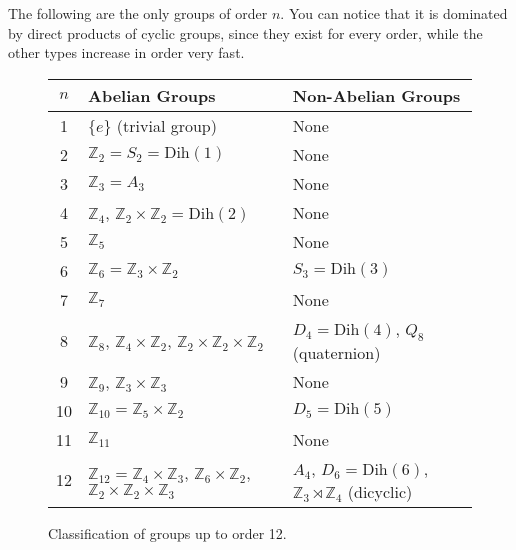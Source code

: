   \begin{theorem}
    The following are the only groups of order $n$. You can notice that it is dominated by direct products of cyclic groups, since they exist for every order, while the other types increase in order very fast.   

    \begin{figure}[H]
      \centering
      \begin{tabular}{|c|l|l|}
      \hline
      $n$ & \textbf{Abelian Groups} & \textbf{Non-Abelian Groups} \\
      \hline
      1 & $\{e\}$ (trivial group) & None \\
      \hline
      2 & $\mathbb{Z}_2 = S_2 = \text{Dih}(1)$ & None \\
      \hline
      3 & $\mathbb{Z}_3 = A_3$ & None \\
      \hline
      4 & $\mathbb{Z}_4$, $\mathbb{Z}_2 \times \mathbb{Z}_2 = \text{Dih}(2)$ & None \\
      \hline
      5 & $\mathbb{Z}_5$ & None \\
      \hline
      6 & $\mathbb{Z}_6 = \mathbb{Z}_3 \times \mathbb{Z}_2$ & $S_3 = \text{Dih}(3)$ \\
      \hline
      7 & $\mathbb{Z}_7$ & None \\
      \hline
      8 & $\mathbb{Z}_8$, $\mathbb{Z}_4 \times \mathbb{Z}_2$, $\mathbb{Z}_2 \times \mathbb{Z}_2 \times \mathbb{Z}_2$ & $D_4 = \text{Dih}(4)$, $Q_8$ (quaternion) \\
      \hline
      9 & $\mathbb{Z}_9$, $\mathbb{Z}_3 \times \mathbb{Z}_3$ & None \\
      \hline
      10 & $\mathbb{Z}_{10} = \mathbb{Z}_5 \times \mathbb{Z}_2$ & $D_5 = \text{Dih}(5)$ \\
      \hline
      11 & $\mathbb{Z}_{11}$ & None \\
      \hline
      12 & $\mathbb{Z}_{12} = \mathbb{Z}_4 \times \mathbb{Z}_3$, $\mathbb{Z}_6 \times \mathbb{Z}_2$, $\mathbb{Z}_2 \times \mathbb{Z}_2 \times \mathbb{Z}_3$ & $A_4$, $D_6 = \text{Dih}(6)$, $\mathbb{Z}_3 \rtimes \mathbb{Z}_4$ (dicyclic) \\
      \hline
      \end{tabular}
      \caption{Classification of groups up to order 12.}
      \label{tab:groups_up_to_order_10}
    \end{figure}
  \end{theorem}


